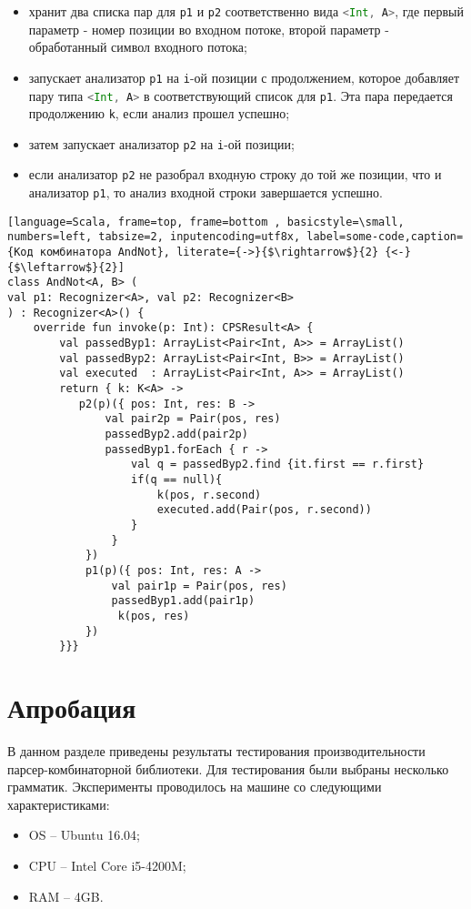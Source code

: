 \begin{itemize}
    \item хранит два списка пар  для \lstinline[language=Scala]{p1} и \lstinline[language=Scala]{p2} соответственно вида \lstinline[language=Scala]{<Int, A>}, где первый параметр - номер позиции во входном потоке, второй параметр - обработанный символ входного потока;
    \item запускает анализатор \lstinline[language=Scala]{p1} на \lstinline[language=Scala]{i}-ой позиции с продолжением, которое добавляет пару типа \lstinline[language=Scala]{<Int, A>} в соответствующий список для \lstinline[language=Scala]{p1}. Эта пара передается продолжению \lstinline[language=Scala]{k}, если анализ прошел успешно;
    \item затем запускает анализатор \lstinline[language=Scala]{p2} на \lstinline[language=Scala]{i}-ой позиции;
    \item если анализатор \lstinline[language=Scala]{p2} не разобрал входную строку до той же позиции, что и анализатор \lstinline[language=Scala]{p1}, то анализ входной строки завершается успешно.
\end{itemize}

\begin{lstlisting}[language=Scala, frame=top, frame=bottom , basicstyle=\small, numbers=left, tabsize=2, inputencoding=utf8x, label=some-code,caption={Код комбинатора AndNot}, literate={->}{$\rightarrow$}{2} {<-}{$\leftarrow$}{2}]
class AndNot<A, B> (
val p1: Recognizer<A>, val p2: Recognizer<B>
) : Recognizer<A>() {
    override fun invoke(p: Int): CPSResult<A> {
        val passedByp1: ArrayList<Pair<Int, A>> = ArrayList()
        val passedByp2: ArrayList<Pair<Int, B>> = ArrayList()
        val executed  : ArrayList<Pair<Int, A>> = ArrayList()
        return { k: K<A> ->
           p2(p)({ pos: Int, res: B ->
               val pair2p = Pair(pos, res)
               passedByp2.add(pair2p)
               passedByp1.forEach { r ->
                   val q = passedByp2.find {it.first == r.first}
                   if(q == null){
                       k(pos, r.second)
                       executed.add(Pair(pos, r.second))
                   }
                }
            })
            p1(p)({ pos: Int, res: A ->
                val pair1p = Pair(pos, res)
                passedByp1.add(pair1p)
                 k(pos, res)
            })
        }}}
\end{lstlisting}

\section{Апробация}
В данном разделе приведены результаты тестирования производительности парсер-комбинаторной библиотеки. Для тестирования были выбраны несколько грамматик. Эксперименты проводилось на машине со следующими характеристиками:
\begin{itemize}
     \item  OS  -- Ubuntu 16.04;
     \item  CPU -- Intel Core i5-4200M;
     \item  RAM -- 4GB.
\end{itemize}

